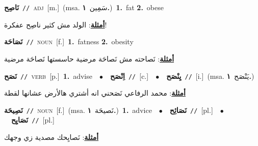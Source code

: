 \documentclass[10pt,a4paper,twoside]{article} %
\begin{document}
\begin{multicols}{2}
{\setlength\topsep{0pt}\textbf{\foreignlanguage{arabic}{نَاصِح}}\ {\color{gray}\texttt{//}\color{black}}\ \textsc{adj}\ [m.]\ \color{gray}(msa. \foreignlanguage{arabic}{سَمِين}~\foreignlanguage{arabic}{\textbf{١.}})\color{black}\ \textbf{1.}~fat  \textbf{2.}~obese\  \begin{flushright}\color{gray}\foreignlanguage{arabic}{\textbf{\underline{\foreignlanguage{arabic}{أمثلة}}}: الولد مش كثير ناصِح عفكرة!}\end{flushright}\color{black}} \vspace{2mm}

{\setlength\topsep{0pt}\textbf{\foreignlanguage{arabic}{نَصَاحَة}}\ {\color{gray}\texttt{//}\color{black}}\ \textsc{noun}\ [f.]\ \textbf{1.}~fatness  \textbf{2.}~obesity\  \begin{flushright}\color{gray}\foreignlanguage{arabic}{\textbf{\underline{\foreignlanguage{arabic}{أمثلة}}}: نَصاحته مش نَصاحَة مرضية حاسستها نَصاحَة مرضية}\end{flushright}\color{black}} \vspace{2mm}

{\setlength\topsep{0pt}\textbf{\foreignlanguage{arabic}{نَصَح}}\ {\color{gray}\texttt{//}\color{black}}\ \textsc{verb}\ [p.]\ \textbf{1.}~advise\ \ $\bullet$\ \ \setlength\topsep{0pt}\textbf{\foreignlanguage{arabic}{اِنْصَح}}\ {\color{gray}\texttt{//}\color{black}}\ [c.]\ \ $\bullet$\ \ \setlength\topsep{0pt}\textbf{\foreignlanguage{arabic}{يِنْصَح}}\ {\color{gray}\texttt{//}\color{black}}\ [i.]\ \color{gray}(msa. \foreignlanguage{arabic}{يَنْصَح}~\foreignlanguage{arabic}{\textbf{١.}})\color{black}\  \begin{flushright}\color{gray}\foreignlanguage{arabic}{\textbf{\underline{\foreignlanguage{arabic}{أمثلة}}}: محمد الرفاعي نَصَحني انه أشتري هالأرض عشانها لقطة}\end{flushright}\color{black}} \vspace{2mm}

{\setlength\topsep{0pt}\textbf{\foreignlanguage{arabic}{نَصِيحَة}}\ {\color{gray}\texttt{//}\color{black}}\ \textsc{noun}\ [f.]\ \color{gray}(msa. \foreignlanguage{arabic}{نَصيحَة}~\foreignlanguage{arabic}{\textbf{١.}})\color{black}\ \textbf{1.}~advice\ \ $\bullet$\ \ \setlength\topsep{0pt}\textbf{\foreignlanguage{arabic}{نَصَائِح}}\ {\color{gray}\texttt{//}\color{black}}\ [pl.]\ \ $\bullet$\ \ \setlength\topsep{0pt}\textbf{\foreignlanguage{arabic}{نَصَايِح}}\ {\color{gray}\texttt{//}\color{black}}\ [pl.]\  \begin{flushright}\color{gray}\foreignlanguage{arabic}{\textbf{\underline{\foreignlanguage{arabic}{أمثلة}}}: نَصايِحك مصدية زي وجهك}\end{flushright}\color{black}} \vspace{2mm}


\end{multicols}
\end{document}
